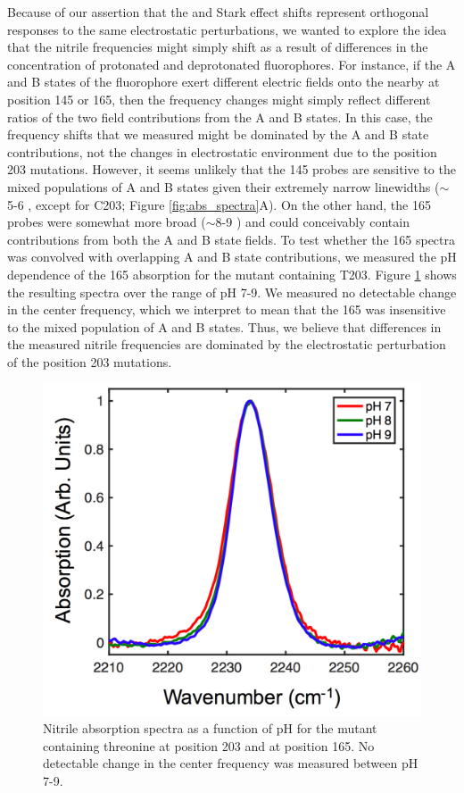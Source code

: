 Because of our assertion that the \pKa{} and Stark effect shifts represent orthogonal responses to the same electrostatic perturbations, we wanted to explore the idea that the nitrile frequencies might simply shift as a result of differences in the concentration of protonated and deprotonated fluorophores.
For instance, if the A and B states of the fluorophore exert different electric fields onto the nearby \pCNF{} at position 145 or 165, then the frequency changes might simply reflect different ratios of the two field contributions from the A and B states.
In this case, the frequency shifts that we measured might be dominated by the A and B state contributions, not the changes in electrostatic environment due to the position 203 mutations.
However, it seems unlikely that the \pCNF{} 145 probes are sensitive to the mixed populations of A and B states given their extremely narrow linewidths ($\sim$5-6 \si{\wn}, except for C203; Figure \ref{fig:abs_spectra}A).
On the other hand, the \pCNF{} 165 probes were somewhat more broad ($\sim$8-9 \si{\wn}) and could conceivably contain contributions from both the A and B state fields.
To test whether the \pCNF{} 165 spectra was convolved with overlapping A and B state contributions, we measured the pH dependence of the \pCNF{} 165 absorption for the mutant containing T203.
Figure \ref{fig:cnf_vs_pH} shows the resulting spectra over the range of pH 7-9.
We measured no detectable change in the center frequency, which we interpret to mean that the \pCNF{} 165 was insensitive to the mixed population of A and B states.
Thus, we believe that differences in the measured nitrile frequencies are dominated by the electrostatic perturbation of the position 203 mutations. 

\begin{figure}
    \center
    \includegraphics[width=\single]{figures-gfp-pKa/cnf_vs_pH.png}
    \caption[Nitrile absorption spectra at various pH levels]{
        Nitrile absorption spectra as a function of pH for the mutant containing threonine at position 203 and \pCNF{} at position 165. 
        No detectable change in the center frequency was measured between pH 7-9.
    }
    \label{fig:cnf_vs_pH}
\end{figure}

